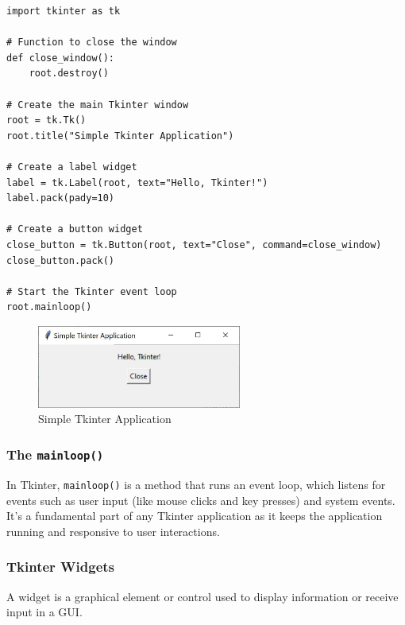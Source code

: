 \begin{codebox}
\begin{verbatim}
import tkinter as tk

# Function to close the window
def close_window():
    root.destroy()

# Create the main Tkinter window
root = tk.Tk()
root.title("Simple Tkinter Application")

# Create a label widget
label = tk.Label(root, text="Hello, Tkinter!")
label.pack(pady=10)

# Create a button widget
close_button = tk.Button(root, text="Close", command=close_window)
close_button.pack()

# Start the Tkinter event loop
root.mainloop()
\end{verbatim}
\end{codebox}

\begin{figure}[h]
    \centering
    \includegraphics[width=0.6\textwidth]{images/tkinter1.JPG}
    \caption{Simple Tkinter Application}
    \label{fig:example}
\end{figure}

\subsubsection{The \texttt{mainloop()}}
In Tkinter, \texttt{mainloop()} is a method that runs an event loop, which listens for events such as user input (like mouse clicks and key presses) and system events. It's a fundamental part of any Tkinter application as it keeps the application running and responsive to user interactions.

\newpage
\subsubsection{Tkinter Widgets}

A widget is a graphical element or control used to display information or receive input in a GUI.

